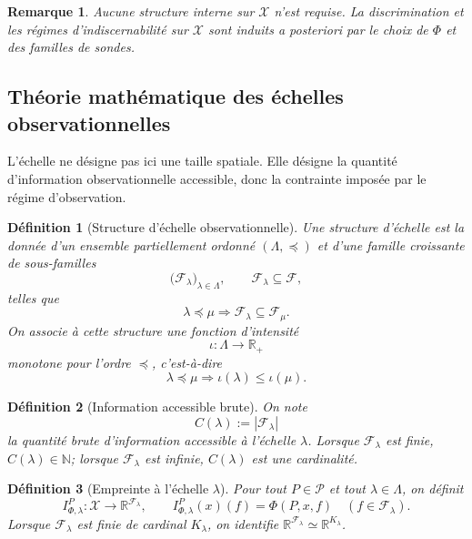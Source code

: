 \documentclass[11pt,a4paper]{article}
\newtheorem{definition}{Définition}
\newtheorem{remark}{Remarque}
\begin{document}
\begin{remark}
Aucune structure interne sur \(\mathcal X\) n'est requise. La discrimination et les régimes d'indiscernabilité sur \(\mathcal X\) sont induits a posteriori par le choix de \(\Phi\) et des familles de sondes.
\end{remark}

\subsection{Théorie mathématique des échelles observationnelles}

L'échelle ne désigne pas ici une taille spatiale. Elle désigne la quantité d'information observationnelle accessible, donc la contrainte imposée par le régime d'observation.

\begin{definition}[Structure d'échelle observationnelle]
Une \emph{structure d'échelle} est la donnée d'un ensemble partiellement ordonné \((\Lambda,\preceq)\) et d'une famille croissante de sous-familles
\[
\bigl(\mathcal F_\lambda\bigr)_{\lambda\in\Lambda},
\qquad
\mathcal F_\lambda\subseteq \mathcal F,
\]
telles que
\[
\lambda\preceq\mu \Longrightarrow \mathcal F_\lambda\subseteq \mathcal F_\mu.
\]
On associe à cette structure une fonction d'intensité
\[
\iota:\Lambda\longrightarrow \mathbb R_+
\]
monotone pour l'ordre \(\preceq\), c'est-à-dire
\[
\lambda\preceq\mu \Longrightarrow \iota(\lambda)\le \iota(\mu).
\]
\end{definition}

\begin{definition}[Information accessible brute]
On note
\[
C(\lambda):=|\mathcal F_\lambda|
\]
la quantité brute d'information accessible à l'échelle \(\lambda\). Lorsque \(\mathcal F_\lambda\) est finie, \(C(\lambda)\in\mathbb N\); lorsque \(\mathcal F_\lambda\) est infinie, \(C(\lambda)\) est une cardinalité.
\end{definition}

\begin{definition}[Empreinte à l'échelle \(\lambda\)]
Pour tout \(P\in\mathcal P\) et tout \(\lambda\in\Lambda\), on définit
\[
I_{\Phi,\lambda}^P:\mathcal X\longrightarrow \mathbb R^{\mathcal F_\lambda},
\qquad
I_{\Phi,\lambda}^P(x)(f)=\Phi(P,x,f)\quad(f\in\mathcal F_\lambda).
\]
Lorsque \(\mathcal F_\lambda\) est finie de cardinal \(K_\lambda\), on identifie \(\mathbb R^{\mathcal F_\lambda}\simeq \mathbb R^{K_\lambda}\).
\end{definition}
\end{document}
